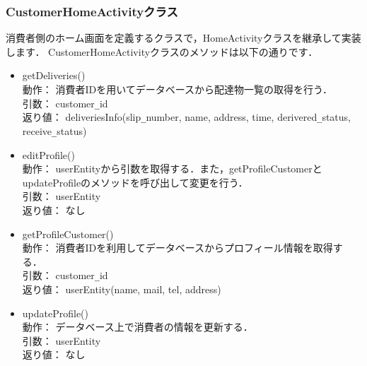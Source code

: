 \documentclass[a4j,titlepage]{jarticle}
\begin{document}
\subsubsection{CustomerHomeActivityクラス}
消費者側のホーム画面を定義するクラスで，HomeActivityクラスを継承して実装します．
CustomerHomeActivityクラスのメソッドは以下の通りです．
  \begin{itemize}
  \item getDeliveries()\\
  動作：  消費者IDを用いてデータベースから配達物一覧の取得を行う．\\
  引数：  customer\verb|_|id\\
  返り値：  deliveriesInfo(slip\verb|_|number, name, address, time, derivered\verb|_|status, receive\verb|_|status)

  \item editProfile()\\
  動作：  userEntityから引数を取得する．また，getProfileCustomerとupdateProfileのメソッドを呼び出して変更を行う．\\
  引数：  userEntity\\
  返り値：  なし

  \item getProfileCustomer()\\
  動作：  消費者IDを利用してデータベースからプロフィール情報を取得する．\\
  引数：  customer\verb|_|id\\
  返り値：  userEntity(name, mail, tel, address)

  \item updateProfile()\\
  動作：  データベース上で消費者の情報を更新する．\\
  引数：  userEntity\\
  返り値：  なし
\end{itemize}
\end{document}
